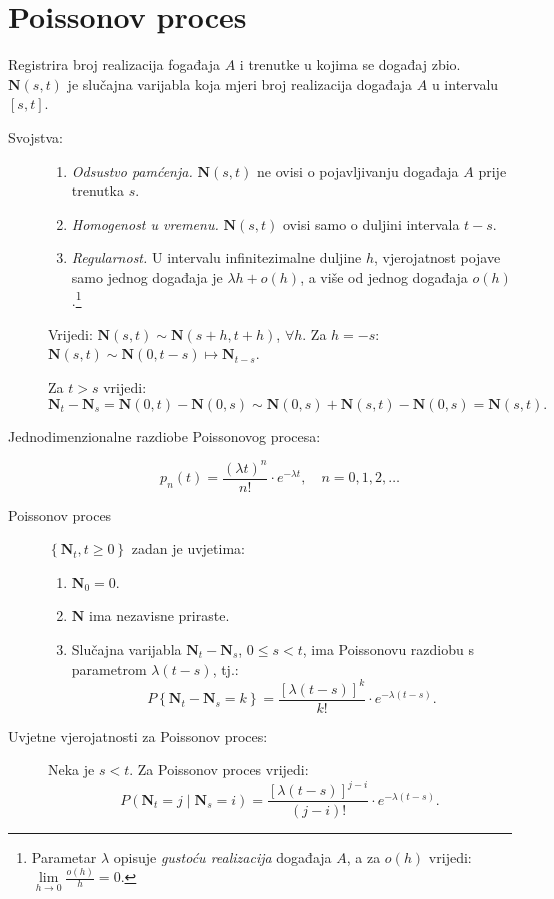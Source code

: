 \documentclass[12pt,english]{article}
\newcommand{\N}{\mathbf N}
\begin{document}
\section{Poissonov proces}
Registrira broj realizacija fogađaja $A$ i trenutke u kojima se događaj zbio.
$\mathbf N(s,t)$ je slučajna varijabla koja mjeri broj realizacija događaja $A$ u intervalu $[s,t]$.

\begin{description}
  \item[Svojstva:]\hfill
    \begin{enumerate}
      \item \emph{Odsustvo pamćenja.} $\mathbf N(s,t)$ ne ovisi o pojavljivanju događaja $A$ prije trenutka $s$.
      \item \emph{Homogenost u vremenu.} $\mathbf N(s,t)$ ovisi samo o duljini intervala $t-s$.
      \item \emph{Regularnost.} U intervalu infinitezimalne duljine $h$, vjerojatnost pojave samo jednog događaja je $\lambda h + o(h)$, a više od jednog događaja $o(h)$.\footnote{Parametar $\lambda$ opisuje \emph{gustoću realizacija} događaja $A$, a za $o(h)$ vrijedi: $\lim\limits_{h\rightarrow 0} \frac{o(h)}{h} = 0$.}
    \end{enumerate}
  Vrijedi: $\mathbf N(s,t) \sim \mathbf N(s+h,t+h)$, $\forall h$. Za $h=-s$: $\mathbf N(s,t) \sim \mathbf N(0,t-s) \mapsto \mathbf N_{t-s}$.

  Za $t>s$ vrijedi:
  $\N_t - \N_s = \N(0,t) - \N(0,s) \sim \N(0,s)+\N(s,t)-\N(0,s) = \N(s,t).$

  \item[Jednodimenzionalne razdiobe Poissonovog procesa:]
  $$p_n(t) = \frac{(\lambda t)^n}{n!}\cdot e^{-\lambda t}, \quad n = 0,1,2,\ldots$$
  \item[Poissonov proces] $\left\{ \N_t, t \geq 0\right\}$ zadan je uvjetima:
  \begin{enumerate}
    \item $\N_0 = 0$.
    \item $\N$ ima nezavisne priraste.
    \item Slučajna varijabla $\N_t-\N_s$, $0 \leq s < t$, ima Poissonovu razdiobu s parametrom $\lambda(t-s)$, tj.:
    $$P\left\{\N_t-\N_s = k\right\} = \frac{\left[ \lambda(t-s)\right]^k}{k!}\cdot e^{-\lambda (t-s)}.$$
  \end{enumerate}

  \item[Uvjetne vjerojatnosti za Poissonov proces:] Neka je $s<t$. Za Poissonov proces vrijedi:
  $$P(\N_t = j\; \vert \; \N_s = i) = \frac{\left[\lambda(t-s)\right]^{j-i}}{(j-i)!}\cdot e^{-\lambda(t-s)}.$$


\end{description}
\end{document}
